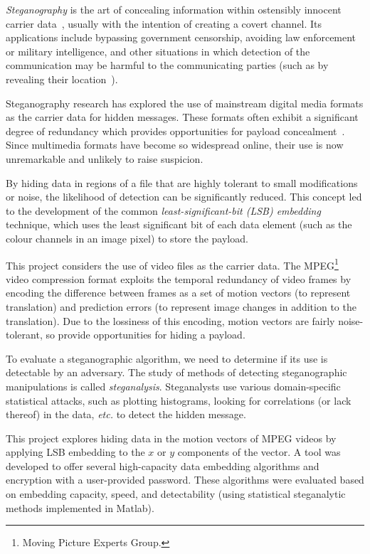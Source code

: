 \documentclass[12pt,british,twoside,notitlepage,usenames,dvipsnames,hypens,final]{report}
\numberwithin{equation}{section}
\numberwithin{figure}{section}
\begin{document}
\emph{Steganography} is the art of concealing information within ostensibly innocent carrier data~\cite[p.~3]{fridrich}, usually with the intention of creating a covert channel. Its applications include bypassing government censorship, avoiding law enforcement or military intelligence, and other situations in which detection of the communication may be harmful to the communicating parties (such as by revealing their location~\cite{infohiding-survey}). 

Steganography research has explored the use of mainstream digital media formats as the carrier data for hidden messages. These formats often exhibit a significant degree of redundancy which provides opportunities for payload concealment~\cite[p.~2]{fridrich}. Since multimedia formats have become so widespread online, their use is now unremarkable and unlikely to raise suspicion.

By hiding data in regions of a file that are highly tolerant to small modifications or noise, the likelihood of detection can be significantly reduced. This concept led to the development of the common \emph{least-significant-bit (LSB) embedding}~\cite{bateman}\label{lsb-steg} technique, which uses the least significant bit of each data element (such as the colour channels in an image pixel) to store the payload.

This project considers the use of video files as the carrier data. The MPEG\footnote{Moving Picture Experts Group.} video compression format exploits the temporal redundancy of video frames by encoding the difference between frames as a set of motion vectors (to represent translation) and prediction errors (to represent image changes in addition to the translation). Due to the lossiness of this encoding, motion vectors are fairly noise-tolerant, so provide opportunities for hiding a payload.

To evaluate a steganographic algorithm, we need to determine if its use is detectable by an adversary. The study of methods of detecting steganographic manipulations is called \emph{steganalysis}. Steganalysts use various domain-specific statistical attacks, such as plotting histograms, looking for correlations (or lack thereof) in the data, \emph{etc.} to detect the hidden message.

This project explores hiding data in the motion vectors of MPEG videos by applying LSB embedding to the $x$ or $y$ components of the vector. A tool was developed to offer several high-capacity data embedding algorithms and encryption with a user-provided password. These algorithms were evaluated based on embedding capacity, speed, and detectability (using statistical steganalytic methods implemented in Matlab).
\end{document}
